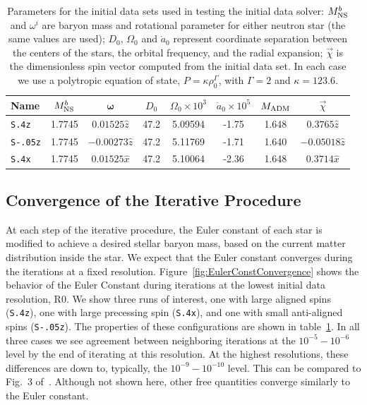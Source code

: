 \begin{table}
\centering
\begin{tabular}{l|cc|ccc|cc}
Name & $M^b_{\rm NS}$ & ${\bm \omega}$ & $D_0$ & $\Omega_0 \times 10^{3}$ & $\dot{a}_0 
\times 10^{5}$  & $M_{\rm ADM}$ &  $\vec\chi$ 
\\\hline
{\tt S.4z} & 1.7745 & $0.01525\hat{z}$ & 47.2 & 5.09594 & -1.75 & 1.648 & $0.3765\hat{z}$ \\
{\tt S-.05z} & 1.7745 & $-0.00273\hat{z}$ & 47.2 & 5.11769 & -1.71 & 1.640 & $-0.05018\hat{z}$ \\
{\tt S.4x} & 1.7745 & $0.01525\hat{x}$ & 47.2 & 5.10064 & -2.36 & 1.648 & $0.3714\hat{x}$\\
\end{tabular}
\caption[Parameters for the initial data sets used in test the initial data solver.]{\label{tab:InitialData}
Parameters for the initial data sets used in testing the initial data solver: $M^b_{\rm NS}$ and $\omega^i$ are baryon mass and rotational parameter for either neutron star (the same values are used); $D_0$, $\Omega_0$ and $\dot a_{0}$ represent coordinate separation between the centers of the stars, the orbital frequency, and the radial expansion; $\vec\chi$ is the dimensionless spin vector computed from the initial data set. In each case we use a polytropic equation of state, $P=\kappa\rho_0^{\Gamma}$, with $\Gamma=2$ and $\kappa=123.6$.}
\end{table}


\subsection{Convergence of the Iterative Procedure}

At each step of the iterative procedure, the Euler constant of each
star is modified to achieve a desired stellar baryon mass, based on
the current matter distribution inside the star. We expect that the Euler constant converges during the iterations at a fixed resolution. Figure~\ref{fig:EulerConstConvergence}  shows the behavior of the Euler Constant during iterations at the lowest initial data resolution, R0. 
We show three runs of interest, one
with large aligned spins ({\tt S.4z}), one with large precessing spin ({\tt S.4x}), and one with small anti-aligned spins ({\tt S-.05z}). The properties of these configurations are shown in table~\ref{tab:InitialData}.
In all three cases we see agreement between neighboring iterations at the
$10^{-5}-10^{-6}$ level by the end of iterating at this resolution. At the highest resolutions, these
differences are down to, typically, the $10^{-9}-10^{-10}$ level.
This can be compared to Fig.~3 of~\cite{GourgoulhonEtAl2001a}.
Although not shown here, other free quantities converge similarly to the Euler constant.


